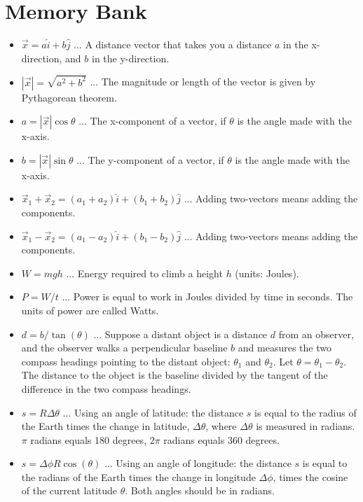 \documentclass[10pt]{article}
\begin{document}
\maketitle

\section{Memory Bank}

\begin{itemize}
\item $\vec{x} = a\hat{i} + b\hat{j}$ ... A distance vector that takes you a distance $a$ in the x-direction, and $b$ in the y-direction.
\item $|\vec{x}| = \sqrt{a^2 + b^2}$ ... The magnitude or length of the vector is given by Pythagorean theorem.
\item $a = |\vec{x}|\cos\theta$ ... The x-component of a vector, if $\theta$ is the angle made with the x-axis.
\item $b = |\vec{x}|\sin\theta$ ... The y-component of a vector, if $\theta$ is the angle made with the x-axis.
\item $\vec{x}_1 + \vec{x}_2 = (a_1 + a_2)\hat{i} + (b_1 + b_2)\hat{j}$ ... Adding two-vectors means adding the components.
\item $\vec{x}_1 - \vec{x}_2 = (a_1 - a_2)\hat{i} + (b_1 - b_2)\hat{j}$ ... Adding two-vectors means adding the components.
\item $W = m g h$ ... Energy required to climb a height $h$ (units: Joules).
\item $P = W/t$ ... Power is equal to work in Joules divided by time in seconds.  The units of power are called Watts.
\item $d = b/\tan(\theta)$ ... Suppose a distant object is a distance $d$ from an observer, and the observer walks a perpendicular baseline $b$ and measures the two compass headings pointing to the distant object: $\theta_1$ and $\theta_2$.  Let $\theta = \theta_1 - \theta_2$.  The distance to the object is the baseline divided by the tangent of the difference in the two compass headings.
\item $s = R\Delta\theta$ ... Using an angle of latitude: the distance $s$ is equal to the radius of the Earth times the change in latitude, $\Delta\theta$, where $\Delta\theta$ is measured in radians.  $\pi$ radians equals 180 degrees, $2\pi$ radians equals 360 degrees.
\item $s = \Delta\phi R \cos(\theta)$ ... Using an angle of longitude: the distance $s$ is equal to the radians of the Earth times the change in longitude $\Delta\phi$, times the cosine of the current latitude $\theta$.  Both angles should be in radians.

\end{itemize}
\end{document}
